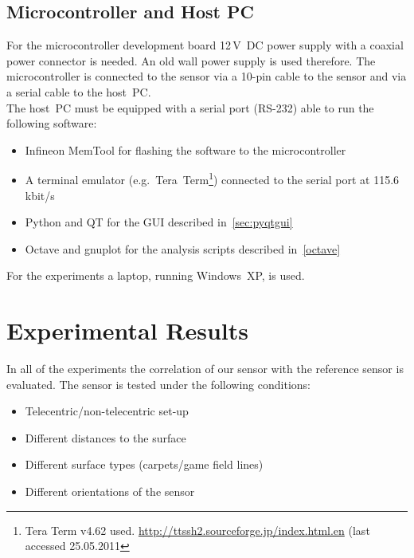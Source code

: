 \documentclass[12pt,a4paper]{article}
\begin{document}
\subsection{Microcontroller and Host PC}      

For the microcontroller development board 12\,V~DC power supply with a coaxial power connector is needed.
An old wall power supply is used therefore.
The microcontroller is connected to the sensor via a 10-pin cable to the sensor and via a serial cable to the host~PC.\\
The host~PC must be equipped with a serial port (RS-232) able to run the following software:
\begin{itemize}
 \item Infineon MemTool for flashing the software to the microcontroller
 \item A terminal emulator (e.g.\ Tera~Term\footnote{Tera Term v4.62 used. \url{http://ttssh2.sourceforge.jp/index.html.en} (last accessed 25.05.2011}) connected to the serial port at 115.6\,kbit/s
 \item Python and QT for the GUI described in~\autoref{sec:pyqtgui}
 \item Octave and gnuplot for the analysis scripts described in~\autoref{octave}
\end{itemize}

For the experiments a laptop, running Windows~XP, is used.


\clearpage
\section{Experimental Results}
\label{exp}

In all of the experiments the correlation of our sensor with the reference sensor is evaluated.
The sensor is tested under the following conditions:

\begin{itemize}
 \item Telecentric/non-telecentric set-up
 \item Different distances to the surface
 \item Different surface types (carpets/game field lines)
 \item Different orientations of the sensor
\end{itemize}
\end{document}
